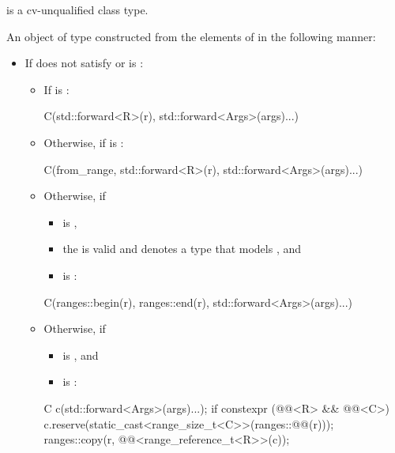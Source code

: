 \documentclass{wg21}
\begin{document}
\begin{itemdescr}
\pnum
\mandates
{} is a cv-unqualified class type.

\pnum
\returns
An object of type 
constructed from the elements of  in the following manner:
\begin{itemize}
\item
If  does not satisfy  or
is :
\begin{itemize}
    \item
    If  is :
    \begin{codeblock}
        C(std::forward<R>(r), std::forward<Args>(args)...)
    \end{codeblock}
    \item
    Otherwise, if
    is :
    \begin{codeblock}
        C(from_range, std::forward<R>(r), std::forward<Args>(args)...)
    \end{codeblock}
    \item
    Otherwise, if
    \begin{itemize}
        \item
         is ,
        \item
        the 
        is valid and denotes a type that models
        , and
        \item
        is :
    \end{itemize}
    \begin{codeblock}
        C(ranges::begin(r), ranges::end(r), std::forward<Args>(args)...)
    \end{codeblock}
    \item
    Otherwise, if
    \begin{itemize}
        \item
         is , and
        \item
         is :
    \end{itemize}
    \begin{codeblock}
        C c(std::forward<Args>(args)...);
        if constexpr (@@<R> && @@<C>)
            c.reserve(static_cast<range_size_t<C>>(ranges::@@(r)));
        ranges::copy(r, @@<range_reference_t<R>>(c));
    \end{codeblock}
\end{itemize}


\end{itemize}
\end{itemdescr}
\end{document}
